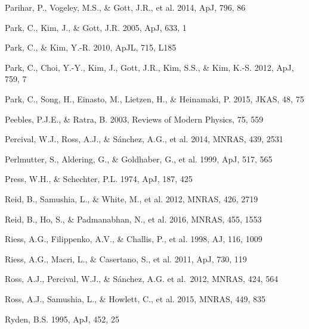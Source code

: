 \documentclass[iop]{emulateapj}
\begin{document}
\begin{thebibliography}{}
Parihar, P., Vogeley, M.S., \& Gott, J.R., et al. 2014, ApJ, 796, 86

Park, C., Kim, J., \& Gott, J.R. 2005, ApJ, 633, 1  

Park, C., \& Kim, Y.-R. 2010, ApJL, 715, L185  

Park, C., Choi, Y.-Y., Kim, J., Gott, J.R., Kim, S.S., \&
Kim, K.-S. 2012, ApJ, 759, 7

Park, C., Song, H., Einasto, M., Lietzen, H., \&
Heinamaki, P. 2015, JKAS, 48, 75

Peebles, P.J.E., \& Ratra, B. 2003, Reviews of Modern Physics, 75, 559

Percival, W.J., Ross, A.J., \& S\'{a}nchez, A.G., et al. 2014, MNRAS, 439, 2531

Perlmutter, S., Aldering, G., \& Goldhaber, G., et al. 1999, ApJ, 517, 565  

Press, W.H., \& Schechter, P.L. 1974, ApJ, 187, 425

Reid, B., Samushia, L., \& White, M., et al. 2012, MNRAS, 426, 2719  

Reid, B., Ho, S., \& Padmanabhan, N., et al.  2016, MNRAS, 455, 1553

Riess, A.G., Filippenko, A.V., \& Challis, P., et al. 1998, AJ, 116, 1009  

Riess, A.G., Macri, L., \& Casertano, S., et al. 2011, ApJ, 730, 119

Ross, A.J., Percival, W.J., \& S{\'a}nchez, A.G. et al.\ 2012, MNRAS, 424, 564 

Ross, A.J., Samushia, L., \& Howlett, C., et al. 2015, MNRAS, 449, 835

Ryden, B.S. 1995, ApJ, 452, 25  



\end{thebibliography}
\end{document}

